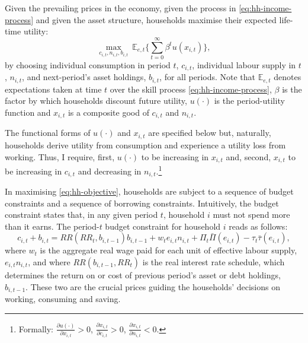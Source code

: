 \documentclass[12pt]{article} %
\numberwithin{equation}{section} %
\begin{document}
Given the prevailing prices in the economy, given the process in \eqref{eq:hh-income-process} and given the asset structure, households maximise their expected life-time utility:
\begin{equation}
    \max_{c_{i,t}, n_{i,t}, b_{i,t}} \ \mathbb{E}_{e,t} \Bigg\{ \sum_{t=0}^{\infty} \beta^t u(x_{i,t}) \Bigg\}, \label{eq:hh-objective}
\end{equation}
by choosing individual consumption in period $t$, $c_{i,t}$, individual labour supply in $t$, $n_{i,t}$, and next-period's asset holdings, $b_{i,t}$, for all periods. Note that $\mathbb{E}_{e,t}$ denotes expectations taken at time $t$ over the skill process \eqref{eq:hh-income-process}, $\beta$ is the factor by which households discount future utility, $u( \cdot )$ is the period-utility function and $x_{i,t}$ is a composite good of $c_{i,t}$ and $n_{i,t}$. 


The functional forms of $u( \cdot )$ and $x_{i,t}$ are specified below but, naturally, households derive utility from consumption and experience a utility loss from working. Thus, I require, first, $u( \cdot )$ to be increasing in $x_{i,t}$ and, second, $x_{i,t}$ to be increasing in $c_{i,t}$ and decreasing in $n_{i,t}$.\footnote{Formally: $\frac{\partial u( \cdot )}{\partial x_{i,t}} > 0$, $\frac{\partial x_{i,t}}{\partial c_{i,t}} > 0$, $\frac{\partial x_{i,t}}{\partial n_{i,t}} < 0$.}

In maximising \eqref{eq:hh-objective}, households are subject to a sequence of budget constraints and a sequence of borrowing constraints. Intuitively, the budget constraint states that, in any given period $t$, household $i$ must not spend more than it earns. The period-$t$ budget constraint for household $i$ reads as follows: 
\begin{equation}
c_{i,t} + b_{i,t} = RR (RR_t, b_{i,t-1}) b_{i,t-1} + w_t e_{i,t} n_{i,t} + \Pi_t \bar{\Pi} (e_{i,t}) - \tau_t \bar{\tau} (e_{i,t}), \label{eq:hh-budget}
\end{equation}
where $w_t$ is the aggregate real wage paid for each unit of effective labour supply, $e_{i,t} n_{i,t}$, and where $RR (b_{i,t-1}, RR_t)$ is the real interest rate schedule, which determines the return on or cost of previous period's asset or debt holdings, $b_{i,t-1}$. These two are the crucial prices guiding the households' decisions on working, consuming and saving. 
\end{document}
